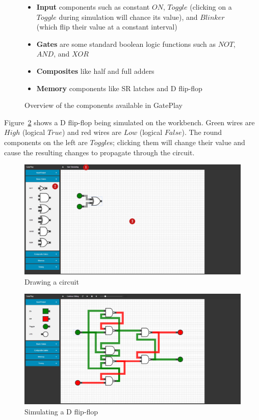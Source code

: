 \begin{figure}
\begin{itemize}
	\item \textbf{Input} components such as constant $ON$, $Toggle$ (clicking on a $Toggle$ during simulation will chance its value), and $Blinker$ (which flip their value at a constant interval)
	\item \textbf{Gates} are some standard boolean logic functions such as $NOT$, $AND$, and $XOR$
	\item \textbf{Composites} like half and full adders
	\item \textbf{Memory} components like SR latches and D flip-flop  
\end{itemize}
\caption{Overview of the components available in GatePlay}
\end{figure}

Figure~\ref{fig:dflopflop} shows a D flip-flop being simulated on the workbench. Green wires are $High$ (logical $True$) and red wires are $Low$ (logical $False$). The round components on the left are $Toggle$s; clicking them will change their value and cause the resulting changes to propagate through the circuit.

\begin{figure}[p]
    \centering
    \includegraphics[width=\textheight,angle=90]{labelled.png}
    \caption{Drawing a circuit}
    \label{fig:interface}
\end{figure}

\begin{figure}[p]
    \centering
    \includegraphics[width=\textheight,angle=90]{dflipflop.png}
    \caption{Simulating a D flip-flop}
    \label{fig:dflopflop}
\end{figure}